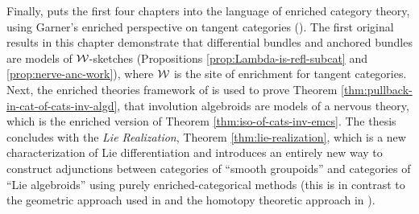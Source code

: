 Finally,  puts the first four chapters into the language of enriched category theory, using Garner's enriched perspective on tangent categories (\cite{Garner2018}). The first original results in this chapter demonstrate that differential bundles and anchored bundles are models of ${\mathcal{W}}$-sketches (Propositions \ref{prop:Lambda-is-refl-subcat} and \ref{prop:nerve-anc-work}), where ${\mathcal{W}}$ is the site of enrichment for tangent categories.
Next, the enriched theories framework of \cite{Bourke2019} is used to prove Theorem \ref{thm:pullback-in-cat-of-cats-inv-algd}, that involution algebroids are models of a nervous theory, which is the enriched version of Theorem \ref{thm:iso-of-cats-inv-emcs}. 
The thesis concludes with the \emph{Lie Realization}, Theorem \ref{thm:lie-realization}, which is a new characterization of Lie differentiation and introduces an entirely new way to construct adjunctions between categories of ``smooth groupoids'' and categories of ``Lie algebroids'' using purely enriched-categorical methods (this is in contrast to the geometric approach used in \cite{Crainic2003} and the homotopy theoretic approach in \cite{Sullivan1977}). 



